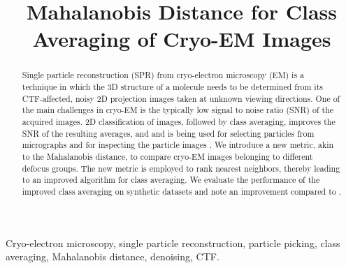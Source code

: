 \documentclass{article}
\title{Mahalanobis Distance for Class Averaging of Cryo-EM Images}
\begin{document}
%
\maketitle
%
\begin{abstract}
Single particle reconstruction (SPR) from cryo-electron microscopy (EM) is a technique in which the 3D structure of a molecule needs to be determined from its CTF-affected, noisy 2D projection images taken at unknown viewing directions. One of the main challenges in cryo-EM is the typically low signal to noise ratio (SNR) of the acquired images. 2D classification of images, followed by class averaging, improves the SNR of the resulting averages, and and is being used for selecting particles from micrographs and for inspecting the particle images \cite{zhao}. We introduce a new metric, akin to the Mahalanobis distance, to compare cryo-EM images belonging to different defocus groups. The new metric is employed to rank nearest neighbors, thereby leading to an improved algorithm for class averaging. We evaluate the performance of the improved class averaging on synthetic datasets and note an improvement compared to \cite{zhao}.

\end{abstract}
%
\begin{keywords}
Cryo-electron microscopy, single particle reconstruction, particle picking, class averaging, Mahalanobis distance, denoising, CTF.
\end{keywords}
%
\end{document}
